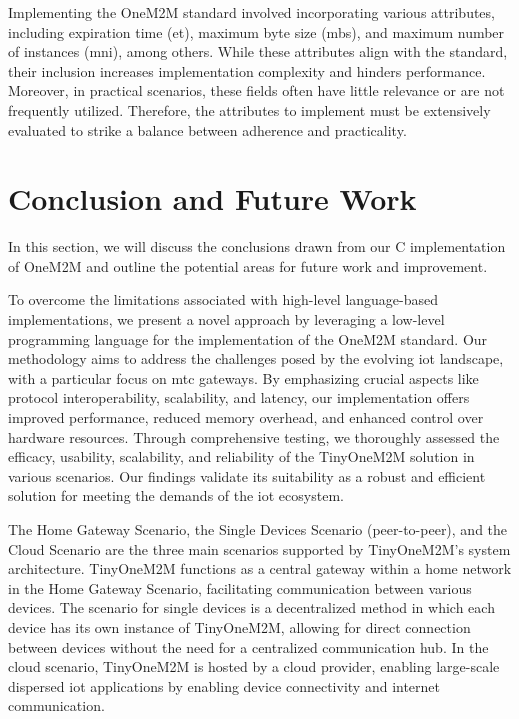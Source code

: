 \documentclass[a4paper,fleqn]{cas-dc}
\begin{document}
Implementing the OneM2M standard involved incorporating various attributes, including expiration time (et), maximum byte size (mbs), and maximum number of instances (mni), among others. While these attributes align with the standard, their inclusion increases implementation complexity and hinders performance. Moreover, in practical scenarios, these fields often have little relevance or are not frequently utilized. Therefore, the attributes to implement must be extensively evaluated to strike a balance between adherence and practicality.

\section{Conclusion and Future Work}
\label{conclusion}

In this section, we will discuss the conclusions drawn from our C implementation of OneM2M and outline the potential areas for future work and improvement.

To overcome the limitations associated with high-level language-based implementations, we present a novel approach by leveraging a low-level programming language for the implementation of the OneM2M standard. Our methodology aims to address the challenges posed by the evolving \gls{iot} landscape, with a particular focus on \gls{mtc} gateways. By emphasizing crucial aspects like protocol interoperability, scalability, and latency, our implementation offers improved performance, reduced memory overhead, and enhanced control over hardware resources. Through comprehensive testing, we thoroughly assessed the efficacy, usability, scalability, and reliability of the TinyOneM2M solution in various scenarios. Our findings validate its suitability as a robust and efficient solution for meeting the demands of the \gls{iot} ecosystem.

The Home Gateway Scenario, the Single Devices Scenario (peer-to-peer), and the Cloud Scenario are the three main scenarios supported by TinyOneM2M's system architecture. TinyOneM2M functions as a central gateway within a home network in the Home Gateway Scenario, facilitating communication between various devices. The scenario for single devices is a decentralized method in which each device has its own instance of TinyOneM2M, allowing for direct connection between devices without the need for a centralized communication hub. In the cloud scenario, TinyOneM2M is hosted by a cloud provider, enabling large-scale dispersed \gls{iot} applications by enabling device connectivity and internet communication. 
\end{document}
